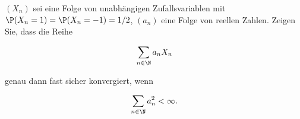 \begin{exercise}

$(X_n)$ sei eine Folge von unabhängigen Zufallsvariablen mit $\P(X_n = 1) = \P(X_n = -1) = 1/2$, $(a_n)$ eine Folge von reellen Zahlen. Zeigen Sie, dass die Reihe

\begin{align*}
  \sum_{n \in \N} a_n X_n
\end{align*}

genau dann fast sicher konvergiert, wenn

\begin{align*}
  \sum_{n \in \N} a_n^2 < \infty.
\end{align*}

\end{exercise}


